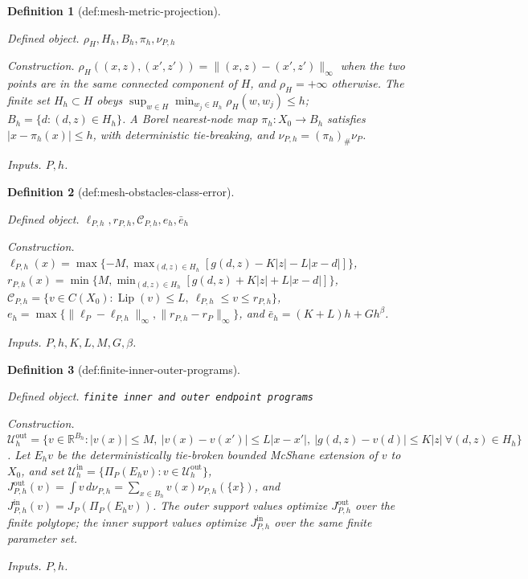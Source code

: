\documentclass{article}
\newtheorem{definition}{Definition}
\begin{document}
\begin{definition}[def:mesh-metric-projection]\label{def:mesh-metric-projection}
\par\smallskip\noindent\emph{Defined object.} \(\rho_H,H_h,B_h,\pi_h,\nu_{P,h}\)
\par\smallskip\noindent\emph{Construction.} \(\rho_H((x,z),(x',z'))=\|(x,z)-(x',z')\|_\infty\) when the two points are in the same connected component of \(H\), and \(\rho_H=+\infty\) otherwise. The finite set \(H_h\subset H\) obeys \(\sup_{w\in H}\min_{w_j\in H_h}\rho_H(w,w_j)\le h\); \(B_h=\{d:(d,z)\in H_h\}\). A Borel nearest-node map \(\pi_h:X_0\to B_h\) satisfies \(|x-\pi_h(x)|\le h\), with deterministic tie-breaking, and \(\nu_{P,h}=(\pi_h)_\#\nu_P\).
\par\smallskip\noindent\emph{Inputs.} \(P,h\).
\end{definition}

\begin{definition}[def:mesh-obstacles-class-error]\label{def:mesh-obstacles-class-error}
\par\smallskip\noindent\emph{Defined object.} \(\ell_{P,h},r_{P,h},\mathcal C_{P,h},e_h,\bar e_h\)
\par\smallskip\noindent\emph{Construction.} \(\ell_{P,h}(x)=\max\{-M,\max_{(d,z)\in H_h}[g(d,z)-K|z|-L|x-d|]\}\), \(r_{P,h}(x)=\min\{M,\min_{(d,z)\in H_h}[g(d,z)+K|z|+L|x-d|]\}\), \(\mathcal C_{P,h}=\{v\in C(X_0):\operatorname{Lip}(v)\le L,\ \ell_{P,h}\le v\le r_{P,h}\}\), \(e_h=\max\{\|\ell_P-\ell_{P,h}\|_\infty,\|r_{P,h}-r_P\|_\infty\}\), and \(\bar e_h=(K+L)h+Gh^\beta\).
\par\smallskip\noindent\emph{Inputs.} \(P,h,K,L,M,G,\beta\).
\end{definition}

\begin{definition}[def:finite-inner-outer-programs]\label{def:finite-inner-outer-programs}
\par\smallskip\noindent\emph{Defined object.} \texttt{finite inner and outer endpoint programs}
\par\smallskip\noindent\emph{Construction.} \(\mathcal U_h^{\mathrm{out}}=\{v\in\mathbb R^{B_h}:|v(x)|\le M,\ |v(x)-v(x')|\le L|x-x'|,\ |g(d,z)-v(d)|\le K|z|\ \forall(d,z)\in H_h\}\). Let \(E_hv\) be the deterministically tie-broken bounded McShane extension of \(v\) to \(X_0\), and set \(\mathcal U_h^{\mathrm{in}}=\{\Pi_P(E_hv):v\in\mathcal U_h^{\mathrm{out}}\}\), \(J_{P,h}^{\mathrm{out}}(v)=\int v\,d\nu_{P,h}=\sum_{x\in B_h}v(x)\nu_{P,h}(\{x\})\), and \(J_{P,h}^{\mathrm{in}}(v)=J_P(\Pi_P(E_hv))\). The outer support values optimize \(J_{P,h}^{\mathrm{out}}\) over the finite polytope; the inner support values optimize \(J_{P,h}^{\mathrm{in}}\) over the same finite parameter set.
\par\smallskip\noindent\emph{Inputs.} \(P,h\).
\end{definition}
\end{document}
